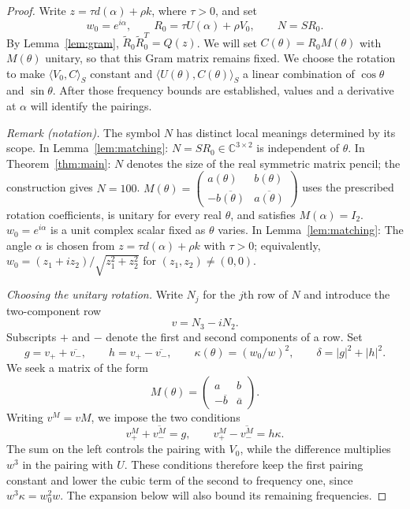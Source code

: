 \begin{proof}
Write $z=\tau d(\alpha)+\rho k$, where $\tau>0$, and set
\[
 w_0=e^{i\alpha},\qquad R_0=\tau U(\alpha)+\rho V_0,
 \qquad N=SR_0.
\]
By Lemma~\ref{lem:gram}, $\widetilde R_0\widetilde R_0^T=Q(z)$.
We will set $C(\theta)=R_0M(\theta)$ with $M(\theta)$ unitary, so
that this Gram matrix remains fixed.  We choose the rotation to make
$\langle V_0,C\rangle_S$ constant and
$\langle U(\theta),C(\theta)\rangle_S$ a linear combination of
$\cos\theta$ and $\sin\theta$.  After those frequency bounds are
established, values and a derivative at $\alpha$ will identify the
pairings.

\noindent\textit{Remark (notation).} The symbol $N$ has distinct local meanings determined by its scope. In Lemma~\ref{lem:matching}: $N=SR_0\in\mathbb C^{3\times2}$ is independent of $\theta$. In Theorem~\ref{thm:main}: $N$ denotes the size of the real symmetric matrix pencil; the construction gives $N=100$. $M(\theta)=\left(\begin{smallmatrix}a(\theta)&b(\theta)\\-\overline{b(\theta)}&\overline{a(\theta)}\end{smallmatrix}\right)$ uses the prescribed rotation coefficients, is unitary for every real $\theta$, and satisfies $M(\alpha)=I_2$. $w_0=e^{i\alpha}$ is a unit complex scalar fixed as $\theta$ varies. In Lemma~\ref{lem:matching}: The angle $\alpha$ is chosen from $z=\tau d(\alpha)+\rho k$ with $\tau>0$; equivalently, $w_0=(z_1+iz_2)/\sqrt{z_1^2+z_2^2}$ for $(z_1,z_2)\neq(0,0)$.


\smallskip
\noindent\emph{Choosing the unitary rotation.}
Write $N_j$ for the $j$th row of $N$ and introduce the two-component row
\[
 v=N_3-iN_2.
\]
Subscripts $+$ and $-$ denote the first and second components of a row.
Set
\[
 g=v_++\overline{v_-},\qquad
 h=v_+-\overline{v_-},\qquad
 \kappa(\theta)=(w_0/w)^2,\qquad
 \delta=|g|^2+|h|^2.
\]
We seek a matrix of the form
\[
 M(\theta)=\begin{pmatrix}a&b\\-\overline b&\overline a\end{pmatrix}.
\]
Writing $v^M=vM$, we impose the two conditions
\begin{equation}\label{eq:rotation-pairings}
 v^M_++\overline{v^M_-}=g,
 \qquad
 v^M_+-\overline{v^M_-}=h\kappa.
\end{equation}
The sum on the left controls the pairing with $V_0$, while the difference
multiplies $w^3$ in the pairing with $U$.  These conditions therefore
keep the first pairing constant and lower the cubic term of the second
to frequency one, since $w^3\kappa=w_0^2w$.  The expansion below will
also bound its remaining frequencies.


\end{proof}
